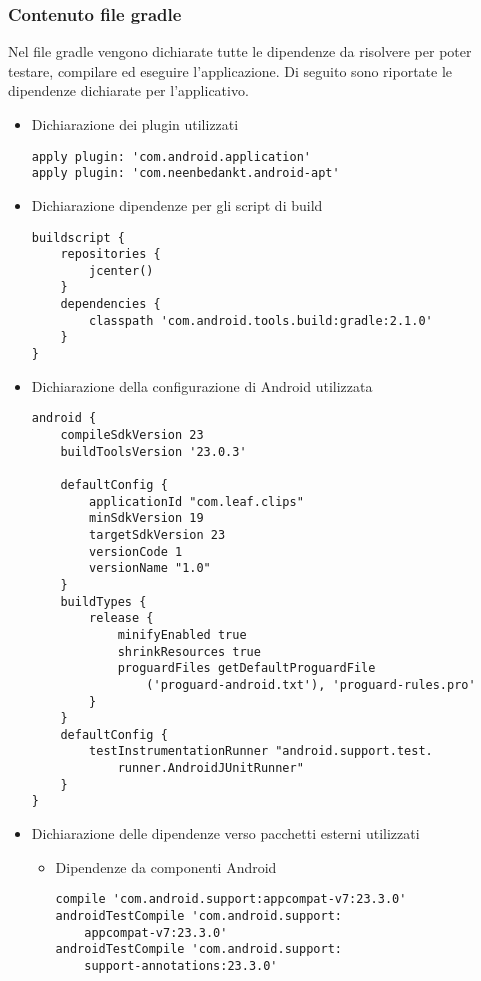 \documentclass[../ManualeSviluppatore.tex]{subfiles}
\begin{document}
		\subsubsection{Contenuto file gradle}
		Nel file gradle vengono dichiarate tutte le dipendenze da risolvere per poter testare, compilare ed eseguire l'applicazione. Di seguito sono riportate le dipendenze dichiarate per l'applicativo. 
		\begin{itemize}
			\item Dichiarazione dei plugin utilizzati
			\lstset{language=Java}
			\begin{lstlisting}
apply plugin: 'com.android.application'
apply plugin: 'com.neenbedankt.android-apt'
			\end{lstlisting}
			\item Dichiarazione dipendenze per gli script di build
			\lstset{language=Java}
			\begin{lstlisting}
buildscript {
    repositories {
        jcenter()
    }
    dependencies {
        classpath 'com.android.tools.build:gradle:2.1.0'
    }
}
			\end{lstlisting}
			\item Dichiarazione della configurazione di Android utilizzata
			\lstset{language=Java}
			\begin{lstlisting}
android {
    compileSdkVersion 23
    buildToolsVersion '23.0.3'

    defaultConfig {
        applicationId "com.leaf.clips"
        minSdkVersion 19
        targetSdkVersion 23
        versionCode 1
        versionName "1.0"
    }
    buildTypes {
        release {
            minifyEnabled true
            shrinkResources true
            proguardFiles getDefaultProguardFile
            	('proguard-android.txt'), 'proguard-rules.pro'
        }
    }
    defaultConfig {
        testInstrumentationRunner "android.support.test.
        	runner.AndroidJUnitRunner"
    }
}

			\end{lstlisting}
			\item Dichiarazione delle dipendenze verso pacchetti esterni utilizzati
				\begin{itemize}
					\item Dipendenze da componenti Android		
						\lstset{language=Java}
						\begin{lstlisting}
compile 'com.android.support:appcompat-v7:23.3.0'
androidTestCompile 'com.android.support:
	appcompat-v7:23.3.0'
androidTestCompile 'com.android.support:
	support-annotations:23.3.0'


\end{lstlisting}
\end{itemize}
\end{itemize}
\end{document}
